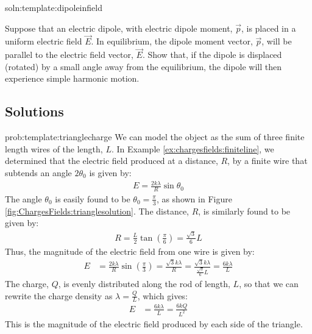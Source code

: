 \begin{problem}{soln:template:dipoleinfield}{\label{prob:template:dipoleinfield}}
	
Suppose that an electric dipole, with electric dipole moment, $\vec p$, is placed in a uniform electric field $\vec E$. In equilibrium, the dipole moment vector, $\vec p$, will be parallel to the electric field vector, $\vec E$. Show that, if the dipole is displaced (rotated) by a small angle away from the equilibrium, the dipole will then experience simple harmonic motion.
\end{problem}

\newpage
\subsection{Solutions}
\begin{solution}{prob:template:trianglecharge}\label{soln:template:trianglecharge}
We can model the object as the sum of three finite length wires of the length, $L$. In Example \ref{ex:chargesfields:finiteline}, we determined that the electric field produced at a distance, $R$, by a finite wire that subtends an angle $2\theta_0$ is given by:
\begin{align*}
E = \frac{2k\lambda}{R}\sin\theta_0
\end{align*}
The angle $\theta_0$ is easily found to be $\theta_0 = \frac{\pi}{3}$, as shown in Figure \ref{fig:ChargesFields:trianglesolution}. The distance, $R$, is similarly found to be given by:
\begin{align*}
R = \frac{L}{2}\tan\left(\frac{\pi}{6}\right)=\frac{\sqrt{3}}{6}L
\end{align*}
Thus, the magnitude of the electric field from one wire is given by:
\begin{align*}
E&= \frac{2k\lambda}{R}\sin\left(\frac{\pi}{3}\right)=\frac{\sqrt{3}k\lambda}{R}=\frac{\sqrt{3}k\lambda}{\frac{\sqrt{3}}{6}L}=\frac{6k\lambda}{L}
\end{align*}
The charge, $Q$, is evenly distributed along the rod of length, $L$, so that we can rewrite the charge density as $\lambda=\frac{Q}{L}$, which gives:
\begin{align*}
E &= \frac{6k\lambda}{L} = \frac{6kQ}{L^2}
\end{align*}
This is the magnitude of the electric field produced by each side of the triangle.


\end{solution}
